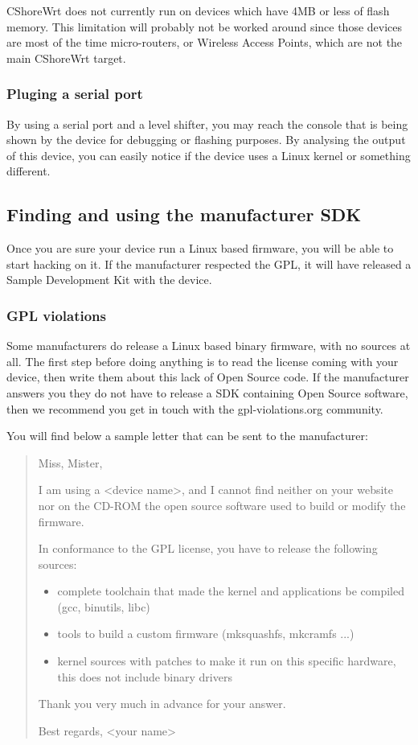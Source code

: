 CShoreWrt does not currently run on devices which have 4MB or less of flash memory.
This limitation will probably not be worked around since those devices are most 
of the time micro-routers, or Wireless Access Points, which are not the main 
CShoreWrt target.

\subsubsection{Pluging a serial port}

By using a serial port and a level shifter, you may reach the console that is being shown by the device
for debugging or flashing purposes. By analysing the output of this device, you can
easily notice if the device uses a Linux kernel or something different.

\subsection{Finding and using the manufacturer SDK}

Once you are sure your device run a Linux based firmware, you will be able to start
hacking on it. If the manufacturer respected the GPL, it will have released a Sample
Development Kit with the device.

\subsubsection{GPL violations}

Some manufacturers do release a Linux based binary firmware, with no sources at all.
The first step before doing anything is to read the license coming with your device,
then write them about this lack of Open Source code. If the manufacturer answers
you they do not have to release a SDK containing Open Source software, then we 
recommend you get in touch with the gpl-violations.org community.

You will find below a sample letter that can be sent to the manufacturer:

\begin{verse}
Miss, Mister,

I am using a <device name>, and I cannot find neither on your website nor on the 
CD-ROM the open source software used to build or modify the firmware.

In conformance to the GPL license, you have to release the following sources:

\begin{itemize}
\item complete toolchain that made the kernel and applications be compiled (gcc, binutils, libc)
\item tools to build a custom firmware (mksquashfs, mkcramfs ...)
\item kernel sources with patches to make it run on this specific hardware, this does not include binary drivers
\end{itemize}

Thank you very much in advance for your answer.

Best regards, <your name>
\end{verse}

